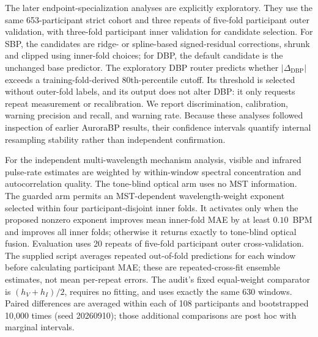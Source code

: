 \documentclass[journal]{IEEEtran}
\begin{document}
The later endpoint-specialization analyses are explicitly exploratory. They use the same 653-participant strict cohort and three repeats of five-fold participant outer validation, with three-fold participant inner validation for candidate selection. For SBP, the candidates are ridge- or spline-based signed-residual corrections, shrunk and clipped using inner-fold choices; for DBP, the default candidate is the unchanged base predictor. The exploratory DBP router predicts whether $|\Delta_{\mathrm{DBP}}|$ exceeds a training-fold-derived 80th-percentile cutoff. Its threshold is selected without outer-fold labels, and its output does not alter DBP: it only requests repeat measurement or recalibration. We report discrimination, calibration, warning precision and recall, and warning rate. Because these analyses followed inspection of earlier AuroraBP results, their confidence intervals quantify internal resampling stability rather than independent confirmation.

For the independent multi-wavelength mechanism analysis, visible and infrared pulse-rate estimates are weighted by within-window spectral concentration and autocorrelation quality. The tone-blind optical arm uses no MST information. The guarded arm permits an MST-dependent wavelength-weight exponent selected within four participant-disjoint inner folds. It activates only when the proposed nonzero exponent improves mean inner-fold MAE by at least $0.10$~BPM and improves all inner folds; otherwise it returns exactly to tone-blind optical fusion. Evaluation uses 20 repeats of five-fold participant outer cross-validation. The supplied script averages repeated out-of-fold predictions for each window before calculating participant MAE; these are repeated-cross-fit ensemble estimates, not mean per-repeat errors. The audit's fixed equal-weight comparator is $(h_V+h_I)/2$, requires no fitting, and uses exactly the same 630 windows. Paired differences are averaged within each of 108 participants and bootstrapped 10{,}000 times (seed 20260910); those additional comparisons are post hoc with marginal intervals.
\end{document}
